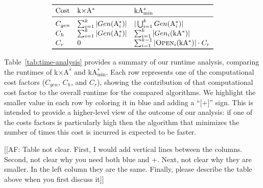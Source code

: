 \documentclass[twoside,11pt]{article}
\newcommand{\kgs}{$k$GP\xspace}
\newcommand{\kastar}{kA$^*$\xspace}
\newcommand{\kastarvar}[1]{\textup{kA}$^*_{#1}$\xspace}
\newcommand{\kastarmin}{\kastarvar{\min}}
\newcommand{\kxastar}{k$\times$A$^*$\xspace}
\newcommand{\astari}[1]{A$^*_#1$\xspace}
\newcommand{\newcode}[1]{#1}
\newcommand{\open}{\textsc{Open}\xspace}
\begin{document}
\begin{table}
  \caption{Analysis of the computational costs incurred by \kxastar and \kastarmin.}
  \label{tab:time-analysis}
  \[
  \begin{array}{lll}
    \toprule
    \text{Cost} & \text{\kxastar}                   & \text{\kastarmin} \\
    \midrule
    C_{gen} & \sum_{i=1}^{k} |Gen(\text{\astari{i}})| & \newcode{|\bigcup_{i=1}^{k} Gen(\text{\astari{i}})|}\\
    C_{h}   & \newcode{\sum_{i=1}^{k} |Gen(\text{\astari{i}})|} & \sum_{i=1}^{k} |Gen_i(\text{\kastar})|\\
    C_r     & \newcode{0}                           & \sum_{i=1}^{k-1} |\open_i(\text{\kastar})| \cdot C_r\\
    \bottomrule
  \end{array}
  \]
\end{table}


Table~\ref{tab:time-analysis} provides a summary of our runtime analysis, comparing the runtimes of \kxastar and \kastarmin.
Each row represents one of the computational cost factors ($C_{gen}$, $C_{h}$, and $C_{r}$), showing the contribution of that computational cost factor to the overall runtime for the compared algorithms.
We highlight the smaller value in each row by coloring it in blue and adding a ``[+]'' sign.
This is intended to provide a higher-level view of the outcome of our analysis: if one of the costs factors is particularly high then the algorithm that minimizes the number of times this cost is incurred is expected to be faster. 

[[AF: Table not clear. First, I would add vertical lines between the columns. Second, not clear why you need both blue and +. Next, not clear why they are smaller. In the left column they are the same. Finally, please describe the table above when you first discuss it]]


\end{document}
